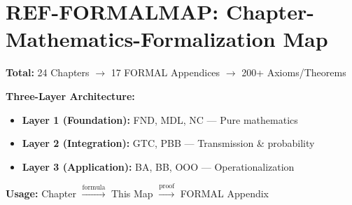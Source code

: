%
%
%
%

\chapter{REF-FORMALMAP: Chapter-Mathematics-Formalization Map}
\label{app:ref-formalmap}

\begin{abstract}
This appendix provides a comprehensive map of the mathematical formalization
that emerges from each EBF chapter. Every chapter generates specific mathematical
structures---equations, axiom systems, theorems---which are fully developed in
dedicated FORMAL appendices. This reference enables navigation between conceptual
content (chapters), core formulas, and rigorous proofs (FORMAL appendices).
The three-layer architecture (Foundation, Integration, Application) organizes
17 FORMAL appendices containing over 200 axioms and theorems.
\end{abstract}

\begin{tcolorbox}[colback=yellow!10!white, colframe=orange!75!black,
    title=\textbf{Quick Reference: Formalization Map}]

\textbf{Total:} 24 Chapters $\rightarrow$ 17 FORMAL Appendices $\rightarrow$ 200+ Axioms/Theorems

\textbf{Three-Layer Architecture:}
\begin{itemize}[nosep]
    \item \textbf{Layer 1 (Foundation):} FND, MDL, NC --- Pure mathematics
    \item \textbf{Layer 2 (Integration):} GTC, PBB --- Transmission \& probability
    \item \textbf{Layer 3 (Application):} BA, BB, OOO --- Operationalization
\end{itemize}

\textbf{Usage:} Chapter $\xrightarrow{\text{formula}}$ This Map $\xrightarrow{\text{proof}}$ FORMAL Appendix

\end{tcolorbox}


